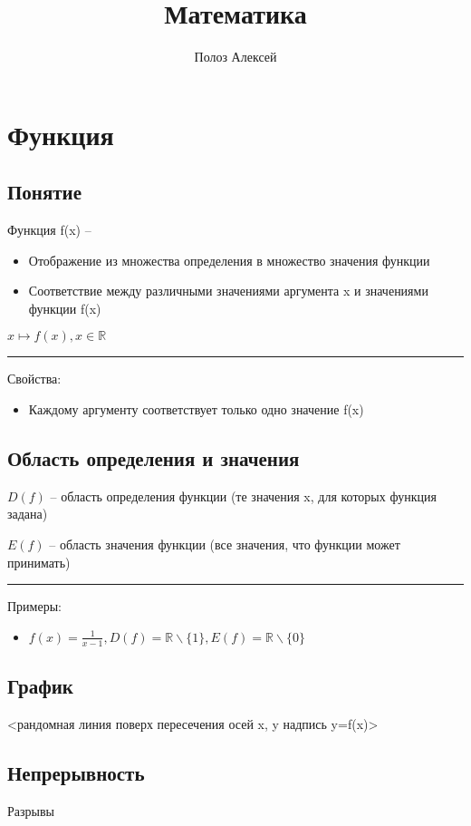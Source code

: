 \documentclass{article}
\title{Математика}
\author{Полоз Алексей}
\begin{document}
\maketitle

\section{Функция}
\label{section:function}
\subsection{Понятие}
Функция f(x) --
\begin{itemize}
    \item Отображение из множества определения в множество значения функции
    \item  Соответствие между различными значениями аргумента x и значениями функции f(x)
\end{itemize}

$x \mapsto f(x), x \in \mathbb{R}$ 


\noindent\rule{\textwidth}{1pt}

Свойства:
\begin{itemize}
    \item Каждому аргументу соответствует только одно значение f(x)
\end{itemize}


\subsection{Область определения и значения}
$D(f)$ -- область определения функции (те значения x, для которых функция задана)

$E(f)$ -- область значения функции (все значения, что функции может принимать)

\noindent\rule{\textwidth}{1pt}

Примеры:
\begin{itemize}
    \item $f(x)=\frac{1}{x-1}, D(f)=\mathbb{R}\backslash\{1\}, E(f)=\mathbb{R}\backslash\{0\}$
\end{itemize}


\subsection{График}
<рандомная линия поверх пересечения осей x, y надпись y=f(x)>


\subsection{Непрерывность}
Разрывы
\end{document}
